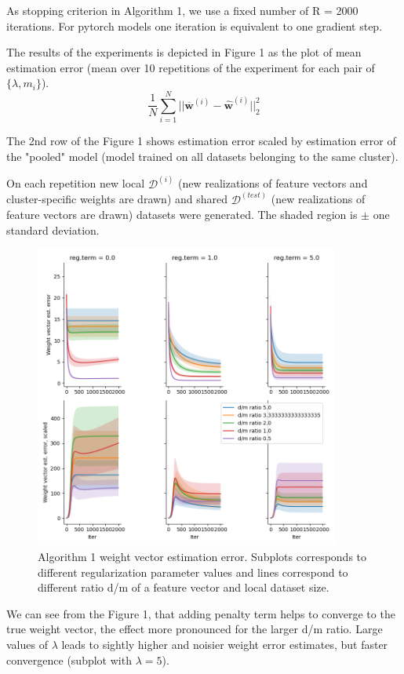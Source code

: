 \documentclass{article}
\begin{document}
As stopping criterion in Algorithm 1, we use a fixed number of R = 2000 iterations. 
For pytorch models one iteration is equivalent to one gradient step.

The results of the experiments is depicted in Figure 1 as the plot of mean estimation error (mean over 10 repetitions of the experiment for each pair of $\{\lambda, m_i \}$). 
\begin{equation} \label{eq:4}
\frac{1}{N} \sum_{i=1}^{N} ||\mathbf{\overline{w}}^{(i)} - \mathbf{\widehat{w}}^{(i)}||^2_2
\end{equation}

The 2nd row of the Figure 1 shows estimation error scaled by estimation error of the "pooled" model (model trained on all datasets belonging to the same cluster).


On each repetition new local $\mathcal{D}^{(i)}$ (new realizations of feature vectors and cluster-specific weights are drawn) and shared $\mathcal{D}^{(test)}$ (new realizations of feature vectors are drawn) datasets were generated. The shaded region is $\pm$ one standard deviation.  

\begin{figure}[h]
\includegraphics[width=10cm]{Linreg_Torch_637015_est_error.png}
\caption{Algorithm 1 weight vector estimation error. Subplots corresponds to different regularization parameter values and lines correspond to different ratio d/m of a feature vector and local dataset size.}
\end{figure}

We can see from the Figure 1, that adding penalty term helps to converge to the true weight vector, the effect more pronounced for the larger d/m ratio. Large values of $\lambda$ leads to sightly higher and noisier weight error estimates, but faster convergence (subplot with $\lambda=5$). 
\end{document}
